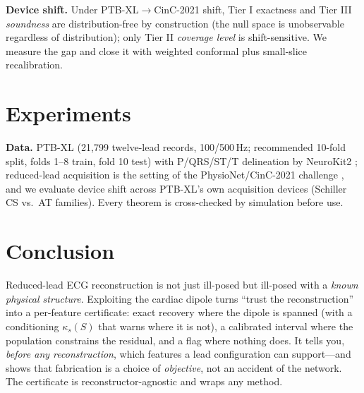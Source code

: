 \documentclass{article}
\begin{document}
\textbf{Device shift.} Under PTB-XL$\rightarrow$CinC-2021 shift, Tier I exactness and
Tier III \emph{soundness} are distribution-free by construction (the null space is
unobservable regardless of distribution); only Tier II \emph{coverage level} is
shift-sensitive. We measure the gap and close it with weighted conformal
\cite{tibshirani2019weighted} plus small-slice recalibration.

\section{Experiments}
\label{sec:exp}

\textbf{Data.} PTB-XL \cite{wagner2020ptbxl} (21{,}799 twelve-lead records, 100/500\,Hz;
recommended 10-fold split, folds 1--8 train, fold 10 test) with P/QRS/ST/T delineation
by NeuroKit2 \cite{makowski2021neurokit}; reduced-lead acquisition is the setting of the
PhysioNet/CinC-2021 challenge \cite{reyna2021cinc}, and we evaluate device shift across
PTB-XL's own acquisition devices (Schiller CS vs.\ AT families). Every theorem is
cross-checked by simulation before use.




\section{Conclusion}
Reduced-lead ECG reconstruction is not just ill-posed but ill-posed with a
\emph{known physical structure}. Exploiting the cardiac dipole turns ``trust the
reconstruction'' into a per-feature certificate: exact recovery where the dipole is
spanned (with a conditioning $\kappa_s(S)$ that warns where it is not), a calibrated
interval where the population constrains the residual, and a flag where nothing does.
It tells you, \emph{before any reconstruction}, which features a lead configuration
can support---and shows that fabrication is a choice of \emph{objective}, not an
accident of the network. The certificate is reconstructor-agnostic and wraps any
method.



\end{document}
